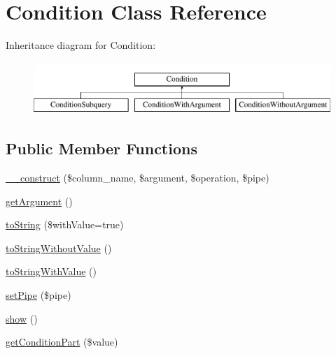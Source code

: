\hypertarget{classCondition}{\section{Condition Class Reference}
\label{classCondition}
}
Inheritance diagram for Condition\-:\begin{figure}[H]
\begin{center}
\leavevmode
\includegraphics[height=2.000000cm]{classCondition}
\end{center}
\end{figure}
\subsection*{Public Member Functions}
\begin{DoxyCompactItemize}
\item 
\hyperlink{classCondition_ab5a9bc2ffebac7d932b22edcc83481fa}{\-\_\-\-\_\-construct} (\$column\-\_\-name, \$argument, \$operation, \$pipe)
\item 
\hyperlink{classCondition_a638fb386fab511447a1770d1653936ed}{get\-Argument} ()
\item 
\hyperlink{classCondition_aa4072b1db0e4f4d3a1dae0f1982781e1}{to\-String} (\$with\-Value=true)
\item 
\hyperlink{classCondition_ae472caca5533fe0442eb56fe38cc8ef1}{to\-String\-Without\-Value} ()
\item 
\hyperlink{classCondition_ac15dfd53b971b98fd34b7cfff99ab4c8}{to\-String\-With\-Value} ()
\item 
\hyperlink{classCondition_a5b8810c0b90532ea2bb73561c6d2f986}{set\-Pipe} (\$pipe)
\item 
\hyperlink{classCondition_a72cefb980f256f8c2ae6801e9c8868b9}{show} ()
\item 
\hyperlink{classCondition_a29b59a5ef75db900c012dc5111fb24cf}{get\-Condition\-Part} (\$value)
\end{DoxyCompactItemize}
